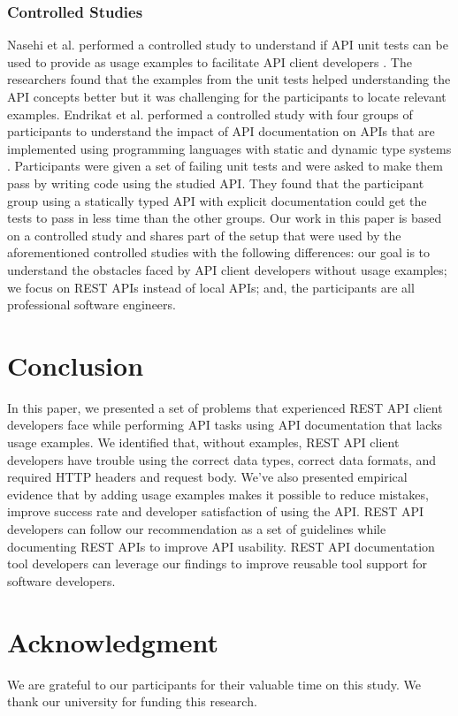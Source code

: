 \documentclass[conference]{IEEEtran}
\begin{document}
\subsubsection{Controlled Studies}
Nasehi et al. performed a controlled study to understand if API unit tests can be used to provide as usage examples to facilitate API client developers \cite{5609553}. The researchers found that the examples from the unit tests helped understanding the API concepts better but it was challenging for the participants to locate relevant examples. Endrikat et al. performed a controlled study with four groups of participants to understand the impact of API documentation on APIs that are implemented using programming languages with static and dynamic type systems \cite{Endrikat:2014:ADS:2568225.2568299}. Participants were given a set of failing unit tests and were asked to make them pass by writing code using the studied API. They found that the participant group using a statically typed API with explicit documentation could get the tests to pass in less time than the other groups. Our work in this paper is based on a controlled study and shares part of the setup that were used by the aforementioned controlled studies with the following differences: our goal is to understand the obstacles faced by API client developers without usage examples;  we focus on REST APIs instead of local APIs; and, the participants are all professional software engineers.

\section{Conclusion}
In this paper, we presented a set of problems that experienced REST API client developers face while performing API tasks using API documentation that lacks usage examples. We identified that, without examples, REST API client developers have trouble using the correct data types, correct data formats, and required HTTP headers and request body. We've also presented empirical evidence that by adding usage examples makes it possible to reduce mistakes, improve success rate and developer satisfaction of using the API. REST API developers can follow our recommendation as a set of guidelines while documenting REST APIs to improve API usability. REST API documentation tool developers can leverage our findings to improve reusable tool support for software developers.

\section*{Acknowledgment}
We are grateful to our participants for their valuable time on this study. We thank our university for funding this research.



\end{document}

